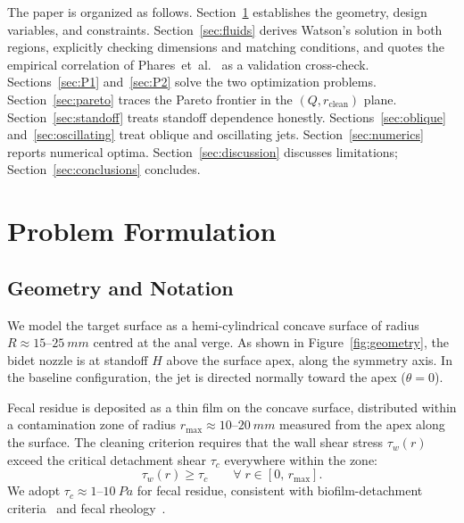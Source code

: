 \documentclass[aps,prfluids,reprint,amsmath,amssymb,floatfix]{revtex4-2}
\begin{document}
The paper is organized as follows. Section~\ref{sec:problem} establishes
the geometry, design variables, and constraints. Section~\ref{sec:fluids}
derives Watson's solution in both regions, explicitly checking dimensions
and matching conditions, and quotes the empirical correlation of
Phares~et~al.~\citep{Phares2000} as a validation cross-check.
Sections~\ref{sec:P1} and~\ref{sec:P2} solve the two optimization problems.
Section~\ref{sec:pareto} traces the Pareto frontier in the $(Q, r_\mathrm{clean})$
plane. Section~\ref{sec:standoff} treats standoff dependence honestly.
Sections~\ref{sec:oblique} and~\ref{sec:oscillating} treat oblique and
oscillating jets. Section~\ref{sec:numerics} reports numerical optima.
Section~\ref{sec:discussion} discusses limitations; Section~\ref{sec:conclusions}
concludes.

\section{Problem Formulation}
\label{sec:problem}

\subsection{Geometry and Notation}

We model the target surface as a hemi-cylindrical concave surface of
radius $R \approx 15$--$\SI{25}{mm}$ centred at the anal verge. As shown
in Figure~\ref{fig:geometry}, the bidet nozzle is at standoff $H$ above
the surface apex, along the symmetry axis. In the baseline configuration,
the jet is directed normally toward the apex ($\theta = 0$).

Fecal residue is deposited as a thin film on the concave surface, distributed
within a contamination zone of radius $r_\mathrm{max} \approx 10$--$\SI{20}{mm}$
measured from the apex along the surface. The cleaning criterion requires
that the wall shear stress $\tau_w(r)$ exceed the critical detachment
shear $\tau_c$ everywhere within the zone:
\begin{equation}
  \tau_w(r) \geq \tau_c \qquad \forall\; r \in [0,\,r_\mathrm{max}].
  \label{eq:cleaning}
\end{equation}
We adopt $\tau_c \approx 1$--$\SI{10}{Pa}$ for fecal residue, consistent
with biofilm-detachment criteria~\citep{Ehedg2003} and fecal
rheology~\citep{Woolley2014}.
\end{document}
